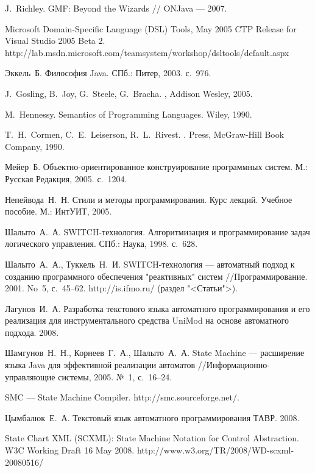 \documentclass[a4paper,10pt]{article}
\begin{document}
\begin{thebibliography}{99}
J.~Richley.
GMF: Beyond the Wizards
// ONJava --- 2007.

Microsoft Domain-Specific Language (DSL) Tools, May
2005 CTP Release for Visual Studio 2005 Beta 2.
http://lab.msdn.microsoft.com/teamsystem/workshop/dsltools/default.aspx

Эккель~Б.
Философия Java.
СПб.: Питер, 2003. с.~976.

J.~Gosling, B.~Joy, G.~Steele, G.~Bracha.
,
Addison Wesley, 2005.

M.~Hennessy.
Semantics of Programming Languages.
Wiley, 1990.

T.~H.~Cormen, C.~E.~Leiserson, R.~L.~Rivest.
.
 Press, McGraw-Hill Book Company, 1990.

Мейер~Б.
Объектно-ориентированное конструирование программных систем.
М.: Русская Редакция, 2005. с.~1204.

Непейвода~Н.~Н.
Стили и методы программирования. Курс лекций. Учебное пособие.
М.: ИнтУИТ, 2005.

Шалыто~А.~А.
SWITCH-технология. Алгоритмизация и программирование задач логического управления.
СПб.: Наука, 1998. с.~628.

Шалыто~А.~А., Туккель~Н.~И.
SWITCH-технология --- автоматный подход к созданию программного обеспечения "реактивных" систем
//Программирование. 2001. No~5, с.~45--62. http://is.ifmo.ru/ (раздел "<Статьи">).

Лагунов~И.~А.
Разработка текстового языка автоматного программирования и его реализация для инструментального средства UniMod на основе автоматного подхода.
2008.

Шамгунов~Н.~Н., Корнеев~Г.~А., Шалыто~А.~А.
State Machine --- расширение языка Java для эффективной реализации автоматов
//Информационно-управляющие системы, 2005. №~1, с.~16--24.

SMC --- State Machine Compiler. http://smc.sourceforge.net/.

Цымбалюк~Е.~А.
Текстовый язык автоматного программирования ТАВР.
2008.

State Chart XML (SCXML): State Machine Notation for Control Abstraction.
W3C Working Draft 16 May 2008.
http://www.w3.org/TR/2008/WD-scxml-20080516/


\end{thebibliography}
\end{document}
